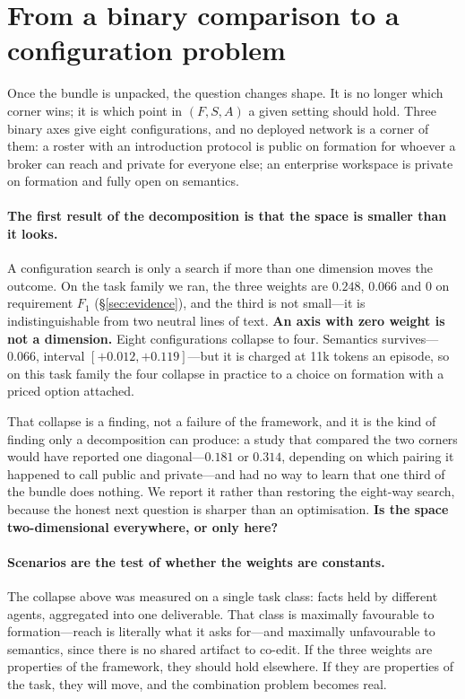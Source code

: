 \section{From a binary comparison to a configuration problem}
\label{sec:combination}

Once the bundle is unpacked, the question changes shape. It is no longer which corner
wins; it is which point in $(F,S,A)$ a given setting should hold. Three binary axes give
eight configurations, and no deployed network is a corner of them: a roster with an
introduction protocol is public on formation for whoever a broker can reach and private
for everyone else; an enterprise workspace is private on formation and fully open on
semantics.

\paragraph{The first result of the decomposition is that the space is smaller than it
looks.} A configuration search is only a search if more than one dimension moves the
outcome. On the task family we ran, the three weights are $0.248$, $0.066$ and $0$
on requirement $F_1$ (\S\ref{sec:evidence}), and the third is not small---it is
indistinguishable from two neutral lines of text. \textbf{An axis with zero weight is not a
dimension.} Eight configurations collapse to four. Semantics survives---$0.066$, interval
$[+0.012, +0.119]$---but it is charged at 11k tokens an episode, so on this task family the
four collapse in practice to a choice on formation with a priced option attached.

That collapse is a finding, not a failure of the framework, and it is the kind of finding
only a decomposition can produce: a study that compared the two corners would have
reported one diagonal---$0.181$ or $0.314$, depending on which pairing it happened to
call public and private---and had no way to learn that one third of the bundle does
nothing. We
report it rather than restoring the eight-way search, because the honest next question is
sharper than an optimisation. \textbf{Is the space two-dimensional everywhere, or only
here?}

\paragraph{Scenarios are the test of whether the weights are constants.} The collapse
above was measured on a single task class: facts held by different agents, aggregated
into one deliverable. That class is maximally favourable to formation---reach is
literally what it asks for---and maximally unfavourable to semantics, since there is no
shared artifact to co-edit. If the three weights are properties of the framework, they
should hold elsewhere. If they are properties of the task, they will move, and the
combination problem becomes real.


